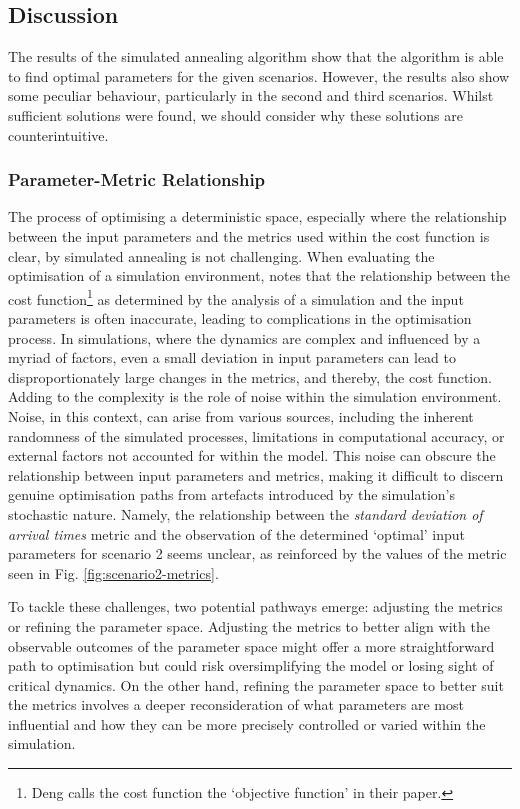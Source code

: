 \documentclass[12pt]{article}
\begin{document}
\subsection{Discussion}
\label{sec:results-discussion}
The results of the simulated annealing algorithm show that the algorithm is able to find optimal parameters for the given scenarios. However, the results also show some peculiar behaviour, particularly in the second and third scenarios. Whilst sufficient solutions were found, we should consider why these solutions are counterintuitive.

\subsubsection{Parameter-Metric Relationship}
The process of optimising a deterministic space, especially where the relationship between the input parameters and the metrics used within the cost function is clear, by simulated annealing is not challenging. When evaluating the optimisation of a simulation environment, \citet{deng} notes that the relationship between the cost function\footnote{Deng calls the cost function the `objective function' in their paper.} as determined by the analysis of a simulation and the input parameters is often inaccurate, leading to complications in the optimisation process. In simulations, where the dynamics are complex and influenced by a myriad of factors, even a small deviation in input parameters can lead to disproportionately large changes in the metrics, and thereby, the cost function. Adding to the complexity is the role of noise within the simulation environment. Noise, in this context, can arise from various sources, including the inherent randomness of the simulated processes, limitations in computational accuracy, or external factors not accounted for within the model. This noise can obscure the relationship between input parameters and metrics, making it difficult to discern genuine optimisation paths from artefacts introduced by the simulation's stochastic nature. Namely, the relationship between the \emph{standard deviation of arrival times} metric and the observation of the determined `optimal' input parameters for scenario 2 seems unclear, as reinforced by the values of the metric seen in Fig. \ref{fig:scenario2-metrics}.

To tackle these challenges, two potential pathways emerge: adjusting the metrics or refining the parameter space. Adjusting the metrics to better align with the observable outcomes of the parameter space might offer a more straightforward path to optimisation but could risk oversimplifying the model or losing sight of critical dynamics. On the other hand, refining the parameter space to better suit the metrics involves a deeper reconsideration of what parameters are most influential and how they can be more precisely controlled or varied within the simulation.
\end{document}
